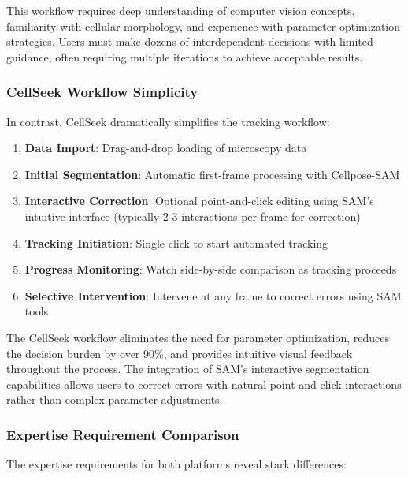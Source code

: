 \documentclass[../cellseek_paper.tex]{subfiles}
\begin{document}
This workflow requires deep understanding of computer vision concepts, familiarity with cellular morphology, and experience with parameter optimization strategies. Users must make dozens of interdependent decisions with limited guidance, often requiring multiple iterations to achieve acceptable results.

\subsubsection{CellSeek Workflow Simplicity}

In contrast, CellSeek dramatically simplifies the tracking workflow:

\begin{enumerate}
  \item \textbf{Data Import}: Drag-and-drop loading of microscopy data
  \item \textbf{Initial Segmentation}: Automatic first-frame processing with Cellpose-SAM
  \item \textbf{Interactive Correction}: Optional point-and-click editing using SAM's intuitive interface (typically 2-3 interactions per frame for correction)
  \item \textbf{Tracking Initiation}: Single click to start automated tracking
  \item \textbf{Progress Monitoring}: Watch side-by-side comparison as tracking proceeds
  \item \textbf{Selective Intervention}: Intervene at any frame to correct errors using SAM tools
\end{enumerate}

The CellSeek workflow eliminates the need for parameter optimization, reduces the decision burden by over 90\%, and provides intuitive visual feedback throughout the process. The integration of SAM's interactive segmentation capabilities allows users to correct errors with natural point-and-click interactions rather than complex parameter adjustments.

\subsubsection{Expertise Requirement Comparison}

The expertise requirements for both platforms reveal stark differences:
\end{document}
